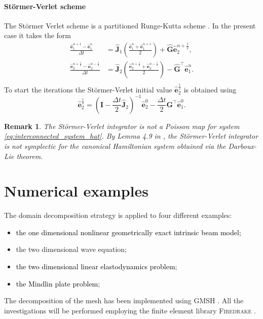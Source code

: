 \documentclass[11pt,a4paper]{article}
\newtheorem{remark}{Remark}
\newcommand{\revtwo}[1]{{\textcolor{black}{#1}}}
\newcommand{\revthree}[1]{{\textcolor{black}{#1}}}
\begin{document}
{\paragraph{St\"ormer-Verlet scheme}
The St\"ormer Verlet scheme is a partitioned Runge-Kutta scheme \cite{hairer2006geometric}. In the present case it takes the form
\begin{equation*}
    \begin{aligned}
    \frac{\widehat{\mathbf{e}}_1^{n+1}-\widehat{\mathbf{e}}_1^n}{\Delta t} &= \widehat{\mathbf{J}}_1 \left(\frac{\widehat{\mathbf{e}}_1^n + \widehat{\mathbf{e}}_1^{n+1}}{2}\right) + \widehat{\mathbf{G}}\widehat{\mathbf{e}}_2^{n+\frac{1}{2}}, \\
    \frac{\widehat{\mathbf{e}}_2^{n +\frac{1}{2}}-\widehat{\mathbf{e}}_2^{n -\frac{1}{2}}}{\Delta t} &= \widehat{\mathbf{J}}_2 \left(\frac{\widehat{\mathbf{e}}_2^{n +\frac{1}{2}}+\widehat{\mathbf{e}}_2^{n-\frac{1}{2}}}{2}\right) - \widehat{\mathbf{G}}^\top \widehat{\mathbf{e}}_1^n. \\
    \end{aligned}
\end{equation*}
To start the iterations the St\"ormer-Verlet initial value $\widehat{\mathbf{e}}_2^{\frac{1}{2}}$ is obtained using
$$\widehat{\mathbf{e}}_2^{\frac{1}{2}} =  (\mathbf{I}- \frac{\Delta t}{2}\widehat{\mathbf{J}}_2)^{-1}\widehat{\mathbf{e}}_2^{0} - \frac{\Delta t}{2}\mathbf{G} ^\top\widehat{\mathbf{e}}_1^0.
$$
\begin{remark}
    The St\"ormer-Verlet integrator is not a Poisson map for system \eqref{eq:interconnected_system_hat}. By Lemma 4.9 in \cite{hairer2006geometric}, the St\"ormer-Verlet integrator is not symplectic for the canonical Hamiltonian system obtained via the Darboux-Lie theorem.
\end{remark}
}


\section{Numerical examples}\label{sec:examples}
The domain decomposition strategy is applied to four different examples:
\begin{itemize}
    \item \revtwo{the one dimensional nonlinear geometrically exact intrinsic beam model;} 
    \item the two dimensional wave equation;
    \item \revthree{the two dimensional linear elastodynamics problem};
    \item \revthree{the Mindlin plate problem};
\end{itemize}
The decomposition of the mesh has been implemented using \textsc{GMSH} \cite{gmsh2009}. All the investigations will be performed employing the finite element library \textsc{Firedrake} \cite{Rathgeber2016Firedrake:Abstractions}. 
\end{document}
